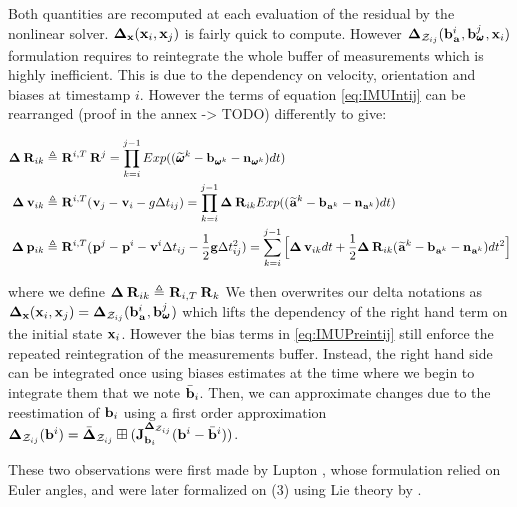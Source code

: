 Both quantities are recomputed at each evaluation of the residual by the nonlinear solver. ${\bm \Delta}_{{\bf x}}({\bf x}_i, {\bf x}_j)$ is fairly quick to compute.
However ${\bm \Delta}_{\mathcal{Z}_{ij}}({\bf b}_{\prescript{}{}{{\bf a}}_{}}^i, {\bf b}_{\prescript{}{}{\pmb{\omega}}_{}}^j, {\bf x}_i)$ formulation requires to reintegrate the whole buffer of measurements which
is highly inefficient. This is due to the dependency on velocity, orientation and biases at timestamp $i$. However the terms of equation \ref{eq:IMUIntij} can 
be rearranged (proof in the annex -> TODO) differently to give:

\begin{equation}
    \begin{split}
    {\bm \Delta} \prescript{}{}{{\bf R}}_{ik} &\triangleq  \prescript{}{}{{\bf R}}_{}^{i,T} \prescript{}{}{{\bf R}}_{}^{j} =  \prod_{k=i}^{j-1} Exp((\prescript{}{}{\widetilde{\pmb{\omega}}}_{}^k - {\bf b}_{\prescript{}{}{\pmb{\omega}}_{}^k} - {\bf n}_{\prescript{}{}{\pmb{\omega}}_{}^k})dt) \\
    {\bm \Delta} \prescript{}{}{{\bf v}}_{ik} &\triangleq \prescript{}{}{{\bf R}}_{}^{i,T} (\prescript{}{}{{\bf v}}_{j} - \prescript{}{}{{\bf v}}_{i} - g \Delta t_{ij}) 
    = \prod_{k=i}^{j-1} {\bm \Delta} \prescript{}{}{{\bf R}}_{ik} Exp((\prescript{}{}{\widetilde{{\bf a}}}_{}^k - {\bf b}_{\prescript{}{}{{\bf a}}_{}^k} - {\bf n}_{\prescript{}{}{{\bf a}}_{}^k})dt)  \\
    {\bm \Delta} \prescript{}{}{{\bf p}}_{ik} &\triangleq \prescript{}{}{{\bf R}}_{}^{i,T}(\prescript{}{}{{\bf p}}_{}^j - \prescript{}{}{{\bf p}}_{}^i - \prescript{}{}{{\bf v}}_{}^i \Delta t_{ij} - \frac{1}{2} {\bf g} \Delta t_{ij}^2) 
    = \sum_{k=i}^{j-1} \Big[{\bm \Delta} \prescript{}{}{{\bf v}}_{ik}dt +  \frac{1}{2} {\bm \Delta} \prescript{}{}{{\bf R}}_{ik} (\prescript{}{}{\widetilde{{\bf a}}}_{}^k - {\bf b}_{\prescript{}{}{{\bf a}}_{}^k} - {\bf n}_{\prescript{}{}{{\bf a}}_{}^k})dt^2 \Big]
    \end{split}
    \label{eq:IMUPreintij}
\end{equation}

where we define ${\bm \Delta} \prescript{}{}{{\bf R}}_{ik} \triangleq \prescript{}{}{{\bf R}}_{i,T} \prescript{}{}{{\bf R}}_{k}$
We then overwrites our delta notations as ${\bm \Delta}_{{\bf x}}({\bf x}_i, {\bf x}_j) = {\bm \Delta}_{\mathcal{Z}_{ij}}({\bf b}_{\prescript{}{}{{\bf a}}_{}}^i, {\bf b}_{\prescript{}{}{\pmb{\omega}}_{}}^j)$
which lifts the dependency of the right hand term on the initial state ${\bf x}_i$. However the bias terms in \ref{eq:IMUPreintij} still enforce the repeated 
reintegration of the measurements buffer. Instead, the right hand side can be integrated once using biases estimates at the time where we begin to integrate them that
we note $\bar{{\bf b}}_i$. Then, we can approximate changes due to the reestimation of ${\bf b}_i$ using a first order approximation 
${\bm \Delta}_{\mathcal{Z}_{ij}}({\bf b}^i) = \bar{{\bm \Delta}}_{\mathcal{Z}_{ij}} \boxplus ({\bf J}^{{\bm \Delta}_{\mathcal{Z}_{ij}}}_{{\bf b}_i} ({\bf b}^i - \bar{{\bf b}}^i))$.

These two observations were first made by Lupton \cite{lupton-09}, whose formulation relied on Euler angles, and were later formalized on \SO(3) using Lie theory
by \cite{forster2017-TRO}. 

